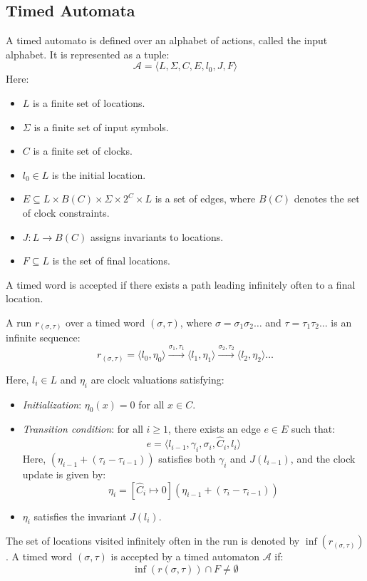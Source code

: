 \subsection{Timed Automata}
A timed automato is defined over an alphabet of actions, called the input alphabet. 
It is represented as a tuple:
\[\mathcal{A} = \langle L, \Sigma, C, E, l_0, J, F \rangle\]
\noindent Here:
\begin{itemize}
    \item $L$ is a finite set of locations.
    \item $\Sigma$ is a finite set of input symbols.
    \item $C$ is a finite set of clocks.
    \item $l_0 \in L$ is the initial location.
    \item $E \subseteq L \times B(C) \times \Sigma \times 2^C \times L$ is a set of edges, where $B(C)$ denotes the set of clock constraints.
    \item $J: L \to B(C)$ assigns invariants to locations.
    \item $F \subseteq L$ is the set of final locations.
\end{itemize}
\noindent A timed word is accepted if there exists a path leading infinitely often to a final location.

\begin{definition}
    A run $r_{(\sigma, \tau)}$ over a timed word $(\sigma, \tau)$, where $\sigma = \sigma_1 \sigma_2 \dots$ and $\tau = \tau_1 \tau_2 \dots$ is an infinite sequence:
    \[r_{(\sigma, \tau)} = \langle l_0, \eta_0 \rangle \xrightarrow{\sigma_1, \tau_1} \langle l_1, \eta_1 \rangle \xrightarrow{\sigma_2, \tau_2} \langle l_2, \eta_2 \rangle \dots\]
\end{definition}

Here, $l_i \in L$ and $\eta_i$ are clock valuations satisfying:
\begin{itemize}
    \item \textit{Initialization}: $\eta_0(x) = 0$ for all $x \in C$.
    \item \textit{Transition condition}: for all $i \geq 1$, there exists an edge $e \in E$ such that:
        \[e = \langle l_{i-1}, \gamma_i, \sigma_i, \hat{C}_i, l_i \rangle\]
        Here, $(\eta_{i-1} + (\tau_i - \tau_{i-1}))$ satisfies both $\gamma_i$ and $J(l_{i-1})$, and the clock update is given by:
        \[\eta_i = [\hat{C}_i \mapsto  0](\eta_{i-1} + (\tau_i - \tau_{i-1}))\]
    \item $\eta_i$ satisfies the invariant $J(l_i)$.
\end{itemize}
\noindent The set of locations visited infinitely often in the run is denoted by $\inf(r_{(\sigma, \tau)})$.
A timed word $(\sigma, \tau)$ is accepted by a timed automaton $\mathcal{A}$ if:
\[\inf(r(\sigma, \tau)) \cap F \neq \emptyset\]

